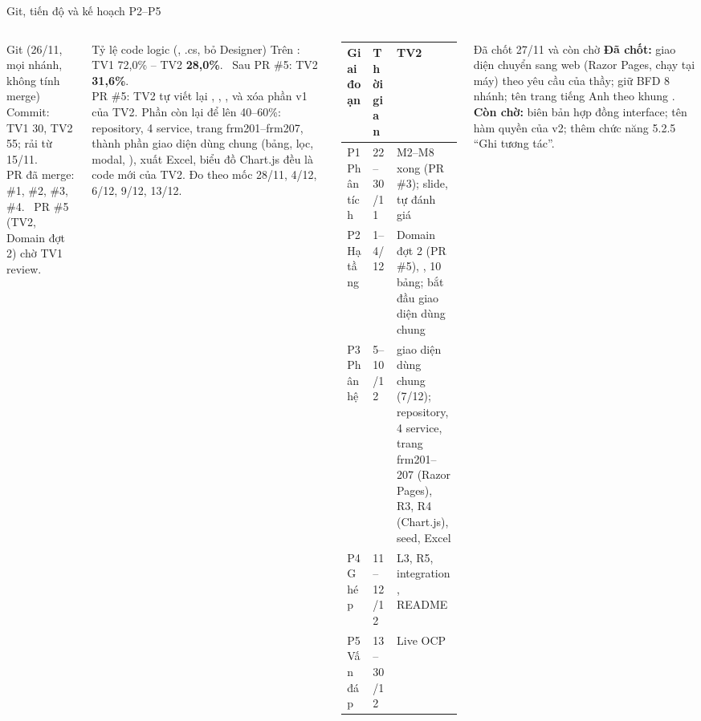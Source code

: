 \begin{frame}{Git, tiến độ và kế hoạch P2--P5 \TC}
\begin{columns}[T]
\begin{block}{Git (26/11, mọi nhánh, không tính merge)}
\scriptsize
Commit: TV1 30, TV2 55; rải từ 15/11.\\
PR đã merge: \#1, \#2, \#3, \#4. \ PR \#5 (TV2, Domain đợt 2) chờ TV1 review.
\end{block}
\begin{alertblock}{Tỷ lệ code logic (, .cs, bỏ Designer)}
\scriptsize
Trên : TV1 72,0\% -- TV2 \textbf{28,0\%}. \ Sau PR \#5: TV2 \textbf{31,6\%}.\\[1mm]
\tiny PR \#5: TV2 tự viết lại , , ,  và xóa phần v1 của TV2. Phần còn lại để lên 40--60\%: repository, 4 service, trang frm201--frm207, thành phần giao diện dùng chung (bảng, lọc, modal, ), xuất Excel, biểu đồ Chart.js đều là code mới của TV2. Đo theo mốc 28/11, 4/12, 6/12, 9/12, 13/12.
\end{alertblock}
\scriptsize
\begin{tabularx}{\linewidth}{@{}L{1.4cm}L{1.1cm}Y@{}}
\toprule
\textbf{Giai đoạn} & \textbf{Thời gian} & \textbf{TV2} \\
\midrule
P1 Phân tích & 22--30/11 & M2--M8 xong (PR \#3); slide, tự đánh giá \\
P2 Hạ tầng & 1--4/12 & Domain đợt 2 (PR \#5), ,  10 bảng; bắt đầu giao diện dùng chung \\
P3 Phân hệ & 5--10/12 & giao diện dùng chung (7/12); repository, 4 service, trang frm201--207 (Razor Pages), R3, R4 (Chart.js), seed, Excel \\
P4 Ghép & 11--12/12 & L3, R5, integration, README \\
P5 Vấn đáp & 13--30/12 & Live OCP  \\
\bottomrule
\end{tabularx}

\vspace{2mm}
\begin{block}{Đã chốt 27/11 và còn chờ}
\tiny \textbf{Đã chốt:} giao diện chuyển sang web (Razor Pages, chạy tại máy) theo yêu cầu của thầy; giữ BFD 8 nhánh; tên trang tiếng Anh theo khung . \textbf{Còn chờ:} biên bản hợp đồng interface; tên hàm quyền của  v2; thêm chức năng 5.2.5 ``Ghi tương tác''.
\end{block}
\end{columns}
\end{frame}

